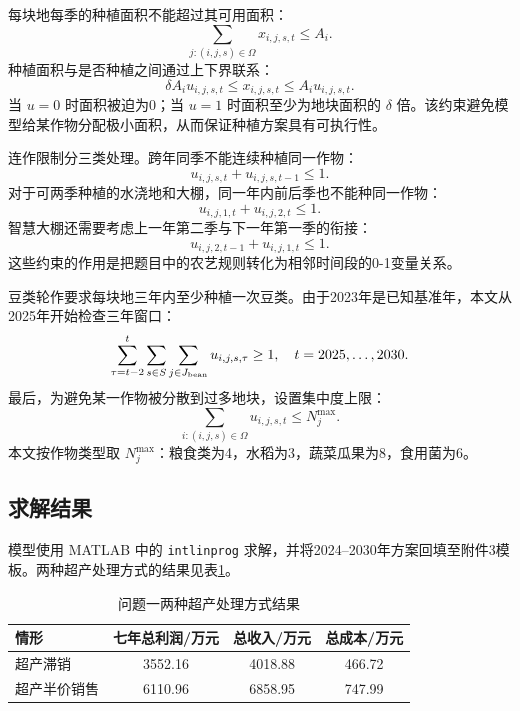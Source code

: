 每块地每季的种植面积不能超过其可用面积：
\begin{equation}
\sum_{j:(i,j,s)\in\Omega}x_{i,j,s,t}\le A_i.
\end{equation}
种植面积与是否种植之间通过上下界联系：
\begin{equation}
\delta A_i u_{i,j,s,t}\le x_{i,j,s,t}\le A_i u_{i,j,s,t}.
\end{equation}
当 $u=0$ 时面积被迫为0；当 $u=1$ 时面积至少为地块面积的 $\delta$ 倍。该约束避免模型给某作物分配极小面积，从而保证种植方案具有可执行性。

连作限制分三类处理。跨年同季不能连续种植同一作物：
\begin{equation}
u_{i,j,s,t}+u_{i,j,s,t-1}\le 1.
\end{equation}
对于可两季种植的水浇地和大棚，同一年内前后季也不能种同一作物：
\begin{equation}
u_{i,j,1,t}+u_{i,j,2,t}\le 1.
\end{equation}
智慧大棚还需要考虑上一年第二季与下一年第一季的衔接：
\begin{equation}
u_{i,j,2,t-1}+u_{i,j,1,t}\le 1.
\end{equation}
这些约束的作用是把题目中的农艺规则转化为相邻时间段的0-1变量关系。

豆类轮作要求每块地三年内至少种植一次豆类。由于2023年是已知基准年，本文从2025年开始检查三年窗口：
\begin{equation}
\sum_{\tau=t-2}^{t}\sum_{s\in S}\sum_{j\in J_{\rm bean}}u_{i,j,s,\tau}\ge 1,\quad t=2025,\ldots,2030.
\end{equation}
最后，为避免某一作物被分散到过多地块，设置集中度上限：
\begin{equation}
\sum_{i:(i,j,s)\in\Omega}u_{i,j,s,t}\le N_j^{\max}.
\end{equation}
本文按作物类型取 $N_j^{\max}$：粮食类为4，水稻为3，蔬菜瓜果为8，食用菌为6。

\subsection{求解结果}

模型使用 MATLAB 中的 \texttt{intlinprog} 求解，并将2024--2030年方案回填至附件3模板。两种超产处理方式的结果见表\ref{tab:q1-result}。

\begin{table}[H]
\centering
\caption{问题一两种超产处理方式结果}
\label{tab:q1-result}
\begin{tabular}{lccc}
\toprule
情形 & 七年总利润/万元 & 总收入/万元 & 总成本/万元 \\
\midrule
超产滞销 & 3552.16 & 4018.88 & 466.72 \\
超产半价销售 & 6110.96 & 6858.95 & 747.99 \\
\bottomrule
\end{tabular}
\end{table}

